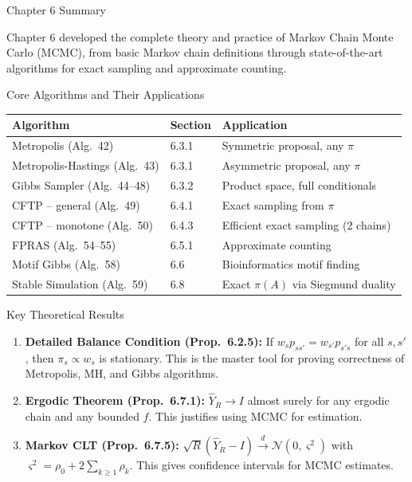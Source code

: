 \documentclass[aspectratio=169,10pt]{beamer}
\begin{document}

\begin{frame}[allowframebreaks]{Chapter 6 Summary}

Chapter 6 developed the complete theory and practice of Markov Chain Monte Carlo (MCMC), from basic Markov chain definitions through state-of-the-art algorithms for exact sampling and approximate counting.

\begin{block}{Core Algorithms and Their Applications}
\begin{tabular}{lll}
\toprule
Algorithm & Section & Application \\
\midrule
Metropolis (Alg.~42) & 6.3.1 & Symmetric proposal, any $\pi$ \\
Metropolis-Hastings (Alg.~43) & 6.3.1 & Asymmetric proposal, any $\pi$ \\
Gibbs Sampler (Alg.~44--48) & 6.3.2 & Product space, full conditionals \\
CFTP -- general (Alg.~49) & 6.4.1 & Exact sampling from $\pi$ \\
CFTP -- monotone (Alg.~50) & 6.4.3 & Efficient exact sampling (2 chains) \\
FPRAS (Alg.~54--55) & 6.5.1 & Approximate counting \\
Motif Gibbs (Alg.~58) & 6.6 & Bioinformatics motif finding \\
Stable Simulation (Alg.~59) & 6.8 & Exact $\pi(A)$ via Siegmund duality \\
\bottomrule
\end{tabular}
\end{block}

\framebreak

\begin{block}{Key Theoretical Results}
\begin{enumerate}
  \item \textbf{Detailed Balance Condition (Prop.~6.2.5):} If $w_s p_{ss'} = w_{s'} p_{s's}$ for all $s,s'$, then $\pi_s \propto w_s$ is stationary.
  This is the master tool for proving correctness of Metropolis, MH, and Gibbs algorithms.

  \item \textbf{Ergodic Theorem (Prop.~6.7.1):} $\hat{Y}_R \to I$ almost surely for any ergodic chain and any bounded $f$.
  This justifies using MCMC for estimation.

  \item \textbf{Markov CLT (Prop.~6.7.5):} $\sqrt{R}(\hat{Y}_R - I) \xrightarrow{d} \mathcal{N}(0,\varsigma^2)$ with $\varsigma^2 = \rho_0 + 2\sum_{k \ge 1}\rho_k$.
  This gives confidence intervals for MCMC estimates.


\end{enumerate}
\end{block}
\end{frame}
\end{document}
